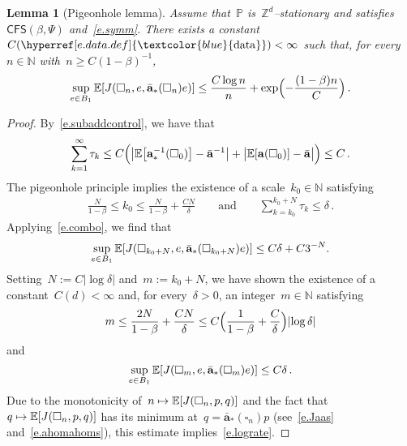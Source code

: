 \documentclass[11pt,twoside]{article} %
\let\oldsquare\square %
\renewcommand{\square}{\oldsquare}
\numberwithin{equation}{section}
\newtheorem{lemma}[theorem]{Lemma}
\theoremstyle{definition}
\newcommand{\dataref}{\hyperref[e.data.def]{\textcolor{blue}{\ensuremath{\mathrm{data}}}}}
\let\originalleft\left
\let\originalright\right
\renewcommand{\left}{\mathopen{}\mathclose\bgroup\originalleft}
\renewcommand{\right}{\aftergroup\egroup\originalright}
\newcommand*{\N}{\ensuremath{\mathbb{N}}}
\newcommand*{\Zd}{\ensuremath{\mathbb{Z}^d}}
\renewcommand{\a}{\mathbf{a}}
\newcommand{\ahom}{\bar{\a}}
\newcommand{\cu}{\square}
\renewcommand{\P}{\mathbb{P}}
\newcommand{\E}{\mathbb{E}}
\newcommand{\CFS}{\mathsf{CFS}}
\begin{document}
\begin{lemma}[Pigeonhole lemma]
\label{l.pigeonhole}
Assume that~$\P$ is~$\Zd$--stationary and satisfies~$\CFS(\beta,\Psi)$ and~\eqref{e.symm}.
There exists a constant~$C(\dataref)<\infty$ such that, for every~$n\in\N$ with~$n \geq C  (1-\beta)^{-1}$, 
\begin{align}
\label{e.lograte}
\sup_{e\in B_1 }
\E \left[ J(\cu_{n},e,\ahom_*(\cu_{n}) e) \right]
\leq
\frac{C \log n}{n} + \exp \Bigl ( - \frac{(1-\beta)n}{C} \Bigr) 
\,.
\end{align}
\end{lemma}
\begin{proof}
By~\eqref{e.subaddcontrol}, we have that 
\begin{equation*}
\sum_{k=1}^\infty \tau_k 
\leq 
C\Bigl(  
\bigl| \E \left[ \a_*^{-1}(\cu_0) \right] - \ahom^{-1} \bigr| 
+ 
\bigl| \E \left[ \a(\cu_0) \right] - \ahom  \bigr| 
\Bigr)
\leq C\,.
\end{equation*}
The pigeonhole principle implies the existence of a scale~$k_0 \in\N$ satisfying 
\begin{align}
\label{e.kdelta}
\frac{N}{1-\beta}
\leq
k_0 
\leq 
\frac{N}{1-\beta} 
+ 
\frac{C N}{\delta}
\qquad \text{and} \qquad
\sum_{k=k_0}^{k_0+N}
\tau_k 
\leq 
\delta
\,. 
\end{align}
Applying~\eqref{e.combo}, we find that
\begin{equation*}
\sup_{e\in B_1}
\E \left[ J(\cu_{k_0+N},e,\ahom_*(\cu_{k_0+N})e) \right]
\leq 
C\delta + C3^{-N}.
\end{equation*}
Setting~$N := C | \log \delta |$ and~$m:=k_0+N$,
we have shown the existence of a constant~$C(d)<\infty$ and, for every~$\delta>0$, an integer~$m \in\N$ satisfying
\begin{equation*}
m
\leq 
\frac{2 N}{1-\beta} 
+ 
\frac{C N}{\delta}
\leq 
C 
\Bigl( \frac{1}{1-\beta} + \frac{C}{\delta} \Bigr) 
\left| \log \delta \right|
\end{equation*}
and
\begin{equation*}
\sup_{e\in B_1 }
\E \left[ J(\cu_{m},e,\ahom_*(\cu_{m}) e) \right]
\leq C\delta\,. 
\end{equation*}
Due to the monotonicity of~$n\mapsto \E \left[ J(\cu_{n},p,q) \right]$ and the fact that~$q\mapsto  \E \left[ J(\cu_{n},p,q) \right]$ has its minimum at~$q=\ahom_*(\cu_n)p$ (see~\eqref{e.Jaas} and~\eqref{e.ahomahoms}), this estimate implies~\eqref{e.lograte}. 
\end{proof}
\end{document}
